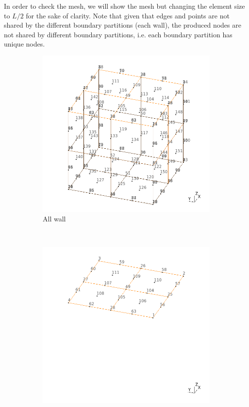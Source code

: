 \documentclass[a4]{article}
\begin{document}
In order to check the mesh, we will show the mesh but changing the element size to $L/2$ for the sake of clarity. Note that given that edges and points are not shared by the different boundary partitions (each wall), the produced nodes are not shared by different boundary partitions, i.e. each boundary partition has unique nodes.

\begin{figure}
  \centering
  \begin{subfigure}[b]{0.48\textwidth}
    \centering
    \includegraphics[width=\textwidth]{mesh_all.png}
    \caption{All wall}
    \label{fig:g1}
  \end{subfigure}
  \\
  \begin{subfigure}[b]{0.48\textwidth}
    \centering
    \includegraphics[width=\textwidth]{mesh_1.png}

\end{subfigure}
\end{figure}
\end{document}
